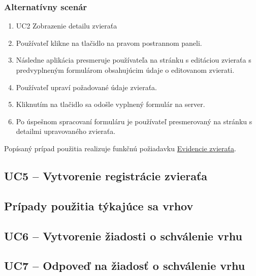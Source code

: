 \subsubsection*{Alternatívny scenár}

\begin{enumerate}
	\item UC2 Zobrazenie detailu zvieraťa
	\item Používateľ klikne na tlačidlo  na pravom postrannom paneli.
	\item Následne aplikácia presmeruje používateľa na stránku s editáciou zvieraťa s predvyplneným formulárom obsahujúcim údaje o editovanom zvierati.
	\item Používateľ upraví požadované údaje zvieraťa.
	\item Kliknutím na tlačidlo  sa odošle vyplnený formulár na server.
	\item Po úspešnom spracovaní formuláru je používateľ presmerovaný na stránku s detailmi upravovaného zvieraťa.
\end{enumerate}

Popísaný prípad použitia realizuje funkčnú požiadavku \hyperref[evidencia-zvierat]{Evidencie zvieraťa}.

\subsection*{UC5 -- Vytvorenie registrácie zvieraťa}

\subsection{Prípady použitia týkajúce sa vrhov}

\subsection*{UC6 -- Vytvorenie žiadosti o schválenie vrhu}

\subsection*{UC7 -- Odpoveď na žiadosť o schválenie vrhu}











